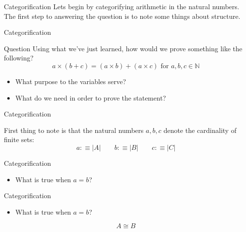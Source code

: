 \documentclass[tikz]{beamer}
\theoremstyle{definition}
\begin{document}
\begin{frame}{Categorification}
    Lets begin by categorifying arithmetic in the natural numbers. The first step to answering the question is to note some things about structure.
\end{frame}{}

\begin{frame}{Categorification}
    \begin{block}{Question}
    Using what we've just learned, how would we prove something like the following? 
        \begin{equation*}
            a \times (b + c) = (a \times b) + (a \times c) \text{ for } a,b,c \in \mathbb{N}
        \end{equation*}
        \begin{itemize}
            \item What purpose to the variables serve? 
            \item What do we need in order to prove the statement? 
        \end{itemize}{}
    \end{block}
\end{frame}{}

\begin{frame}{Categorification}
    \begin{block}{}
        First thing to note is that the natural numbers $a, b, c$ denote the cardinality of finite sets: 
        \begin{equation*}
            a :\equiv |A| \qquad b :\equiv |B| \qquad c :\equiv |C|
        \end{equation*}
    \end{block}
\end{frame}{}

\begin{frame}{Categorification}
    \begin{block}{}
        \begin{itemize}
            \item What is true when $a = b$?
        \end{itemize}
    \end{block}{}
\end{frame}

\begin{frame}{Categorification}
    \begin{block}{}
        \begin{itemize}
            \item What is true when $a = b$?
        \end{itemize}

        \begin{equation*}
            A \cong B
        \end{equation*}
    \end{block}
    
\end{frame}
\end{document}
